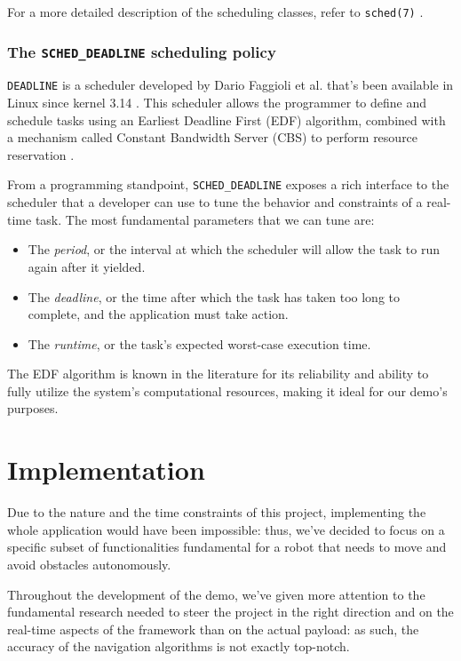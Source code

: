 \documentclass[a4paper,12pt]{report}
\begin{document}
For a more detailed description of the scheduling classes, refer to \texttt{sched(7)} \cite{man-sched-7}.

\subsubsection{The \texttt{SCHED\_DEADLINE} scheduling policy}

\texttt{DEADLINE} is a scheduler developed by Dario Faggioli et al. \cite{lwn-faggioli-mail} that's been available in Linux since kernel 3.14 \cite{kn-linux-314}. This scheduler allows the programmer to define and schedule tasks using an Earliest Deadline First (EDF) algorithm, combined with a mechanism called Constant Bandwidth Server (CBS) to perform resource reservation \cite{cbs-algorithm}.

From a programming standpoint, \texttt{SCHED\_DEADLINE} exposes a rich interface to the scheduler that a developer can use to tune the behavior and constraints of a real-time task. The most fundamental parameters that we can tune are: 

\begin{itemize}
    \item The \textit{period}, or the interval at which the scheduler will allow the task to run again after it yielded.
    \item The \textit{deadline}, or the time after which the task has taken too long to complete, and the application must take action.
    \item The \textit{runtime}, or the task's expected worst-case execution time.
\end{itemize}

The EDF algorithm is known in the literature for its reliability and ability to fully utilize the system's computational resources, making it ideal for our demo's purposes.

\section{Implementation}

Due to the nature and the time constraints of this project, implementing the whole application would have been impossible: thus, we've decided to focus on a specific subset of functionalities fundamental for a robot that needs to move and avoid obstacles autonomously. 

Throughout the development of the demo, we've given more attention to the fundamental research needed to steer the project in the right direction and on the real-time aspects of the framework than on the actual payload: as such, the accuracy of the navigation algorithms is not exactly top-notch.
\end{document}
